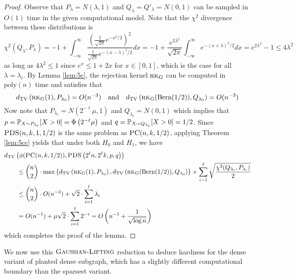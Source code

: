 \begin{proof}
Observe that $P_{\lambda} = N(\lambda, 1)$ and $Q_{\lambda} = Q'_\lambda = N(0, 1)$ can be sampled in $O(1)$ time in the given computational model. Note that the $\chi^2$ divergence between these distributions is
$$\chi^2\left( Q_\lambda, P_\lambda \right) = -1 + \int_{-\infty}^\infty \frac{\left( \frac{1}{\sqrt{2\pi}} e^{-x^2/2}\right)^2}{\frac{1}{\sqrt{2\pi}} e^{-(x-\lambda)^2/2}}dx = -1 + \frac{e^{2\lambda^2}}{\sqrt{2\pi}} \int_{-\infty}^\infty e^{-(x+\lambda)^2/2} dx = e^{2\lambda^2} - 1 \le 4 \lambda^2$$
as long as $4\lambda^2 \le 1$ since $e^x \le 1 + 2x$ for $x \in [0, 1]$, which is the case for all $\lambda = \lambda_i$. By Lemma \ref{lem:5c}, the rejection kernel $\textsc{rk}_{\text{G}}$ can be computed in $\text{poly}(n)$ time and satisfies that
$$d_{\text{TV}}\left(\textsc{rk}_{\text{G}}(1), P_{\lambda_0} \right) = O(n^{-3}) \quad \text{and} \quad d_{\text{TV}}\left(\textsc{rk}_{\text{G}}(\text{Bern}(1/2)), Q_{\lambda_0} \right) = O(n^{-3})$$
Now note that $P_{\lambda_\ell} = N(2^{-\ell}\mu, 1)$ and $Q_{\lambda_\ell} = N(0, 1)$ which implies that $p = \mathbb{P}_{X \sim P_{\lambda_\ell}}[X > 0] = \Phi\left(2^{-\ell}\mu\right)$ and $q = \mathbb{P}_{X \sim Q_{\lambda_\ell}}[X > 0] = 1/2$. Since $\textsc{PDS}(n, k, 1, 1/2)$ is the same problem as $\textsc{PC}(n, k, 1/2)$, applying Theorem \ref{lem:5cc} yields that under both $H_0$ and $H_1$, we have
\begin{align*}
&d_{\text{TV}}\left( \phi(\textsc{PC}(n, k, 1/2)), \textsc{PDS}\left( 2^\ell n, 2^\ell k, p, q \right) \right) \\
&\quad \quad \le \binom{n}{2} \cdot \max\left\{ d_{\text{TV}}\left(\textsc{rk}_{\text{G}}(1), P_{\lambda_0} \right), d_{\text{TV}}\left(\textsc{rk}_{\text{G}}(\text{Bern}(1/2)), Q_{\lambda_0} \right) \right\} + \sum_{i = 1}^\ell \sqrt{\frac{\chi^2(Q_{\lambda_i}, P_{\lambda_i})}{2}} \\
&\quad \quad \le \binom{n}{2} \cdot O(n^{-3}) + \sqrt{2} \cdot \sum_{i = 1}^\ell \lambda_i \\
&\quad \quad = O(n^{-1}) + \mu \sqrt{2} \cdot \sum_{i = 1}^\ell 2^{-i} = O\left(n^{-1} + \frac{1}{\sqrt{\log n}} \right)
\end{align*}
which completes the proof of the lemma.
\end{proof}

We now use this $\textsc{Gaussian-Lifting}$ reduction to deduce hardness for the dense variant of planted dense subgraph, which has a slightly different computational boundary than the sparsest variant.

